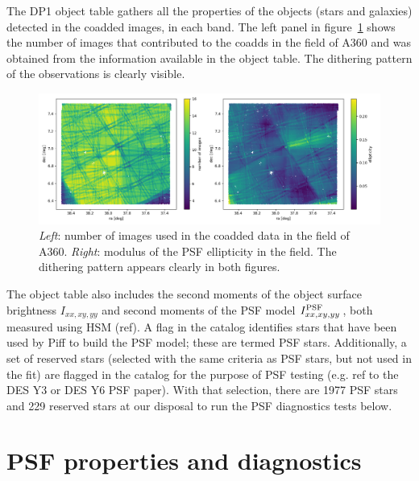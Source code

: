\documentclass[SE,lsstdraft,authoryear,toc]{lsstdoc}
\begin{document}
The DP1 object table gathers all the properties of the objects (stars and galaxies) detected in the coadded images, in each band. The left panel in figure~\ref{fig:dither} shows the number of images that contributed to the coadds in the field of A360 and was obtained from the  information available in the object table. The dithering pattern of the observations is clearly visible.
\begin{figure}
\includegraphics[width=\textwidth]{Figures/psf_ellipticity_visits.png}
\caption{\emph{Left}: number of images used in the coadded data in the field of A360. \emph{Right}: modulus of the PSF ellipticity in the field. The dithering pattern appears clearly in both figures.\label{fig:dither}}
\end{figure}

The object table also includes the second moments of the object surface brightness $I_{xx,xy,yy}$ and second moments of the PSF model $I_{xx,xy,yy}^{\rm PSF}\,$, both measured using HSM (ref). A flag in the catalog identifies stars that have been used by Piff to build the PSF model; these are termed PSF stars. Additionally, a set of reserved stars (selected with the same criteria as PSF stars, but not used in the fit) are flagged in the catalog for the purpose of PSF testing (e.g. ref to the DES Y3 or DES Y6 PSF paper). 
With that selection, there are 1977 PSF stars and 229 reserved stars at our disposal to run the PSF diagnostics tests below. 


\section{PSF properties and diagnostics}
\end{document}
